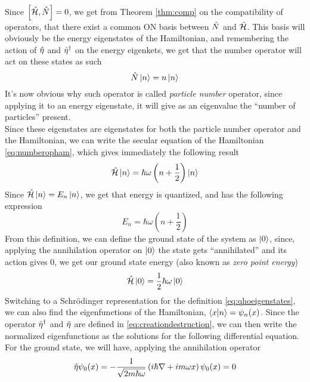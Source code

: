 \documentclass[../qm.tex]{subfiles}
\begin{document}
	Since $\comm{\opr{\ham}}{\opr{N}}=0$, we get from Theorem \ref{thm:comp} on the compatibility of operators, that there exist a common ON basis between $\hat{N}$ and $\hat{\mathcal{H}}$. This basis will obviously be the energy eigenstates of the Hamiltonian, and remembering the action of $\hat{\eta}$ and $\hat{\eta}^{\dagger}$ on the energy eigenkets, we get that the number operator will act on these states as such
	\begin{equation}
		\hat{N}\ket{n}=n\ket{n}
		\label{eq:numberoperatoraction}
	\end{equation}
	It's now obvious why such operator is called \textit{particle number} operator, since applying it to an energy eigenstate, it will give as an eigenvalue the ``number of particles'' present.\\
	Since these eigenstates are eigenstates for both the particle number operator and the Hamiltonian, we can write the secular equation of the Hamiltonian \eqref{eq:numberopham}, which gives immediately the following result
	\begin{equation}
		\hat{\mathcal{H}}\ket{n}=\hbar\omega\left( n+\frac{1}{2} \right)\ket{n}
		\label{eq:secularequation}
	\end{equation}
	Since $\hat{\mathcal{H}}\ket{n}=E_n\ket{n}$, we get that energy is quantized, and has the following expression
	\begin{equation}
		E_n=\hbar\omega\left( n+\frac{1}{2} \right)
		\label{eq:energyqho}
	\end{equation}
	From this definition, we can define the ground state of the system as $\ket{0}$, since, applying the annihilation operator on $\ket{0}$ the state gets ``annihilated'' and its action gives $0$, we get our ground state energy (also known as \textit{zero point energy})
	\begin{equation}
		\hat{\mathcal{H}}\ket{0}=\frac{1}{2}\hbar\omega\ket{0}
		\label{eq:qhogroundstate}
	\end{equation}
	Switching to a Schrödinger representation for the definition \eqref{eq:qhoeigenstates}, we can also find the eigenfunctions of the Hamiltonian, $\bra{x}\ket{n}=\psi_n(x)$. Since the operator $\hat{\eta}^{\dagger}$ and $\hat{\eta}$ are defined in \eqref{eq:creationdestruction}, we can then write the normalized eigenfunctions as the solutions for the following differential equation. For the ground state, we will have, applying the annihilation operator
	\begin{equation}
		\hat{\eta}\psi_0(x)=-\frac{1}{\sqrt{2m\hbar\omega}}\left( i\hbar\nabla+im\omega x\right)\psi_0(x)=0
		\label{eq:groundstateqho}
	\end{equation}
\end{document}
